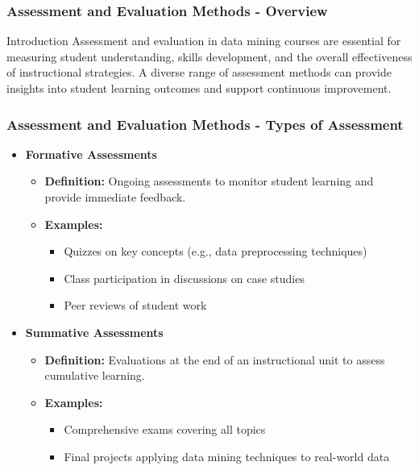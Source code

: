 \documentclass[aspectratio=169]{beamer}
\begin{document}
\begin{frame}[fragile]
    \frametitle{Assessment and Evaluation Methods - Overview}
    \begin{block}{Introduction}
        Assessment and evaluation in data mining courses are essential for measuring student understanding, skills development, and the overall effectiveness of instructional strategies. A diverse range of assessment methods can provide insights into student learning outcomes and support continuous improvement.
    \end{block}
\end{frame}

\begin{frame}[fragile]
    \frametitle{Assessment and Evaluation Methods - Types of Assessment}
    \begin{itemize}
        \item \textbf{Formative Assessments}
            \begin{itemize}
                \item \textbf{Definition:} Ongoing assessments to monitor student learning and provide immediate feedback.
                \item \textbf{Examples:}
                    \begin{itemize}
                        \item Quizzes on key concepts (e.g., data preprocessing techniques)
                        \item Class participation in discussions on case studies
                        \item Peer reviews of student work
                    \end{itemize}
            \end{itemize}
        
        \item \textbf{Summative Assessments}
            \begin{itemize}
                \item \textbf{Definition:} Evaluations at the end of an instructional unit to assess cumulative learning.
                \item \textbf{Examples:}
                    \begin{itemize}
                        \item Comprehensive exams covering all topics
                        \item Final projects applying data mining techniques to real-world data
                    \end{itemize}
            \end{itemize}


\end{itemize}
\end{frame}
\end{document}

